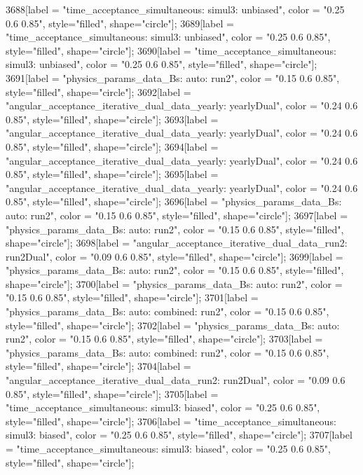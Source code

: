 {	3688[label = "time_acceptance_simultaneous\ntimeacc: simul3\ntrigger: unbiased", color = "0.25 0.6 0.85", style="filled", shape="circle"];
	3689[label = "time_acceptance_simultaneous\ntimeacc: simul3\ntrigger: unbiased", color = "0.25 0.6 0.85", style="filled", shape="circle"];
	3690[label = "time_acceptance_simultaneous\ntimeacc: simul3\ntrigger: unbiased", color = "0.25 0.6 0.85", style="filled", shape="circle"];
	3691[label = "physics_params_data_Bs\nfit: auto\nyear: run2", color = "0.15 0.6 0.85", style="filled", shape="circle"];
	3692[label = "angular_acceptance_iterative_dual_data_yearly\nangacc: yearlyDual", color = "0.24 0.6 0.85", style="filled", shape="circle"];
	3693[label = "angular_acceptance_iterative_dual_data_yearly\nangacc: yearlyDual", color = "0.24 0.6 0.85", style="filled", shape="circle"];
	3694[label = "angular_acceptance_iterative_dual_data_yearly\nangacc: yearlyDual", color = "0.24 0.6 0.85", style="filled", shape="circle"];
	3695[label = "angular_acceptance_iterative_dual_data_yearly\nangacc: yearlyDual", color = "0.24 0.6 0.85", style="filled", shape="circle"];
	3696[label = "physics_params_data_Bs\nfit: auto\nyear: run2", color = "0.15 0.6 0.85", style="filled", shape="circle"];
	3697[label = "physics_params_data_Bs\nfit: auto\nyear: run2", color = "0.15 0.6 0.85", style="filled", shape="circle"];
	3698[label = "angular_acceptance_iterative_dual_data_run2\nangacc: run2Dual", color = "0.09 0.6 0.85", style="filled", shape="circle"];
	3699[label = "physics_params_data_Bs\nfit: auto\nyear: run2", color = "0.15 0.6 0.85", style="filled", shape="circle"];
	3700[label = "physics_params_data_Bs\nfit: auto\nyear: run2", color = "0.15 0.6 0.85", style="filled", shape="circle"];
	3701[label = "physics_params_data_Bs\nfit: auto\ntrigger: combined\nyear: run2", color = "0.15 0.6 0.85", style="filled", shape="circle"];
	3702[label = "physics_params_data_Bs\nfit: auto\nyear: run2", color = "0.15 0.6 0.85", style="filled", shape="circle"];
	3703[label = "physics_params_data_Bs\nfit: auto\ntrigger: combined\nyear: run2", color = "0.15 0.6 0.85", style="filled", shape="circle"];
	3704[label = "angular_acceptance_iterative_dual_data_run2\nangacc: run2Dual", color = "0.09 0.6 0.85", style="filled", shape="circle"];
	3705[label = "time_acceptance_simultaneous\ntimeacc: simul3\ntrigger: biased", color = "0.25 0.6 0.85", style="filled", shape="circle"];
	3706[label = "time_acceptance_simultaneous\ntimeacc: simul3\ntrigger: biased", color = "0.25 0.6 0.85", style="filled", shape="circle"];
	3707[label = "time_acceptance_simultaneous\ntimeacc: simul3\ntrigger: biased", color = "0.25 0.6 0.85", style="filled", shape="circle"];
}
